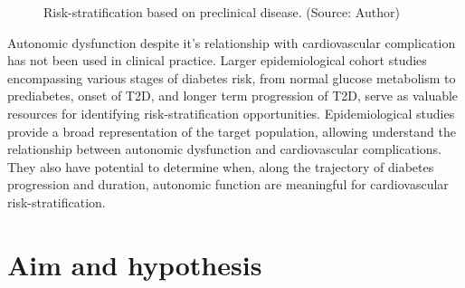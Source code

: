 \documentclass[
  a4paper,
  headsepline=true,
  open=any]{scrbook}
\begin{document}
\begin{figure}

\begin{minipage}[t]{\linewidth}

{\centering 


\caption{Risk-stratification based on preclinical disease. (Source:
Author)}

}

\end{minipage}%

\end{figure}

Autonomic dysfunction despite it's relationship with cardiovascular
complication has not been used in clinical practice. Larger
epidemiological cohort studies encompassing various stages of diabetes
risk, from normal glucose metabolism to prediabetes, onset of T2D, and
longer term progression of T2D, serve as valuable resources for
identifying risk-stratification opportunities. Epidemiological studies
provide a broad representation of the target population, allowing
understand the relationship between autonomic dysfunction and
cardiovascular complications. They also have potential to determine
when, along the trajectory of diabetes progression and duration,
autonomic function are meaningful for cardiovascular
risk-stratification.


\hypertarget{aim-and-hypothesis}{%
\chapter{Aim and hypothesis}\label{aim-and-hypothesis}}
\end{document}
